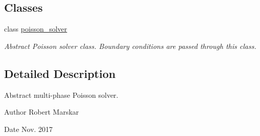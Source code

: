 \subsection*{Classes}
\begin{DoxyCompactItemize}
\item 
class \hyperlink{classpoisson__solver}{poisson\+\_\+solver}
\begin{DoxyCompactList}\small\item\em Abstract Poisson solver class. Boundary conditions are passed through this class. \end{DoxyCompactList}\end{DoxyCompactItemize}


\subsection{Detailed Description}
Abstract multi-\/phase Poisson solver. 

\begin{DoxyAuthor}{Author}
Robert Marskar 
\end{DoxyAuthor}
\begin{DoxyDate}{Date}
Nov. 2017 
\end{DoxyDate}
